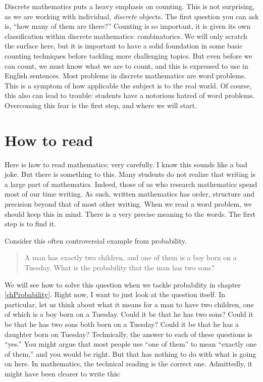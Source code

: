 
Discrete mathematics puts a heavy emphasis on counting.  This is not surprising, as we are working with individual, {\em discrete} objects.  The first question you can ask is, ``how many of them are there?''  Counting is so important, it is given its own classification within discrete mathematics: combinatorics.  We will only scratch the surface here, but it is important to have a solid foundation in some basic counting techniques before tackling more challenging topics.  But even before we can count, we must know what we are to count, and this is expressed to use in English sentences.  Most problems in discrete mathematics are word problems.  This is a symptom of how applicable the subject is to the real world.  Of course, this also can lead to trouble: students have a notorious hatred of word problems.  Overcoming this fear is the first step, and where we will start.

\section{How to read}

Here is how to read mathematics: very carefully.  I know this sounds like a bad joke.  But there is something to this.  Many students do not realize that writing is a large part of mathematics.  Indeed, those of us who research mathematics spend most of our time writing.  As such, written mathematics has order, structure and precision beyond that of most other writing.  When we read a word problem, we should keep this in mind.  There is a very precise meaning to the words.  The first step is to find it.

Consider this often controversial example from probability.

\begin{quote}
 A man has exactly two children, and one of them is a boy born on a Tuesday.  What is the probability that the man has two sons?
\end{quote}

We will see how to solve this question when we tackle probability in chapter \ref{chProbability}.  Right now, I want to just look at the question itself.  In particular, let us think about what it means for a man to have two children, one of which is a boy born on a Tuesday.  Could it be that he has two sons?  Could it be that he has two sons both born on a Tuesday?  Could it be that he has a daughter born on Tuesday?  Technically, the answer to each of these questions is ``yes.''  You might argue that most people use ``one of them'' to mean ``exactly one of them,'' and you would be right.  But that has nothing to do with what is going on here.  In mathematics, the technical reading is the correct one.  Admittedly, it might have been clearer to write this:

